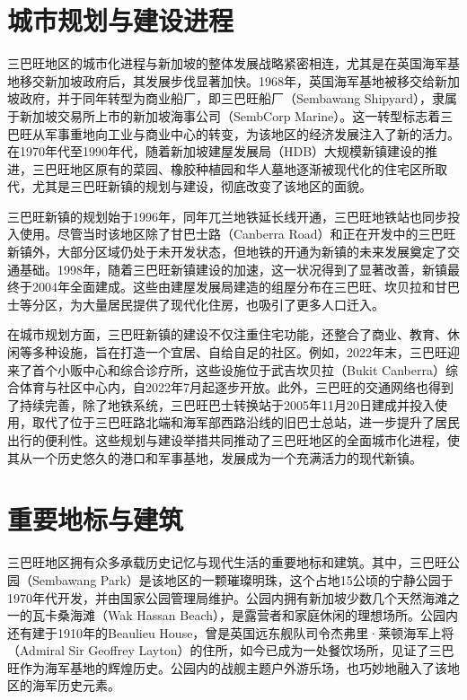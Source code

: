 \documentclass[11pt,a4paper,twoside,openany]{book}
\begin{document}
\section{城市规划与建设进程}
三巴旺地区的城市化进程与新加坡的整体发展战略紧密相连，尤其是在英国海军基地移交新加坡政府后，其发展步伐显著加快。1968年，英国海军基地被移交给新加坡政府，并于同年转型为商业船厂，即三巴旺船厂（Sembawang Shipyard），隶属于新加坡交易所上市的新加坡海事公司（SembCorp Marine）。这一转型标志着三巴旺从军事重地向工业与商业中心的转变，为该地区的经济发展注入了新的活力。在1970年代至1990年代，随着新加坡建屋发展局（HDB）大规模新镇建设的推进，三巴旺地区原有的菜园、橡胶种植园和华人墓地逐渐被现代化的住宅区所取代，尤其是三巴旺新镇的规划与建设，彻底改变了该地区的面貌。

三巴旺新镇的规划始于1996年，同年兀兰地铁延长线开通，三巴旺地铁站也同步投入使用。尽管当时该地区除了甘巴士路（Canberra Road）和正在开发中的三巴旺新镇外，大部分区域仍处于未开发状态，但地铁的开通为新镇的未来发展奠定了交通基础。1998年，随着三巴旺新镇建设的加速，这一状况得到了显著改善，新镇最终于2004年全面建成。这些由建屋发展局建造的组屋分布在三巴旺、坎贝拉和甘巴士等分区，为大量居民提供了现代化住房，也吸引了更多人口迁入。

在城市规划方面，三巴旺新镇的建设不仅注重住宅功能，还整合了商业、教育、休闲等多种设施，旨在打造一个宜居、自给自足的社区。例如，2022年末，三巴旺迎来了首个小贩中心和综合诊疗所，这些设施位于武吉坎贝拉（Bukit Canberra）综合体育与社区中心内，自2022年7月起逐步开放。此外，三巴旺的交通网络也得到了持续完善，除了地铁系统，三巴旺巴士转换站于2005年11月20日建成并投入使用，取代了位于三巴旺路北端和海军部西路沿线的旧巴士总站，进一步提升了居民出行的便利性。这些规划与建设举措共同推动了三巴旺地区的全面城市化进程，使其从一个历史悠久的港口和军事基地，发展成为一个充满活力的现代新镇。

\section{重要地标与建筑}
三巴旺地区拥有众多承载历史记忆与现代生活的重要地标和建筑。其中，三巴旺公园（Sembawang Park）是该地区的一颗璀璨明珠，这个占地15公顷的宁静公园于1970年代开发，并由国家公园管理局维护。公园内拥有新加坡少数几个天然海滩之一的瓦卡桑海滩（Wak Hassan Beach），是露营者和家庭休闲的理想场所。公园内还有建于1910年的Beaulieu House，曾是英国远东舰队司令杰弗里·莱顿海军上将（Admiral Sir Geoffrey Layton）的住所，如今已成为一处餐饮场所，见证了三巴旺作为海军基地的辉煌历史。公园内的战舰主题户外游乐场，也巧妙地融入了该地区的海军历史元素。
\end{document}
